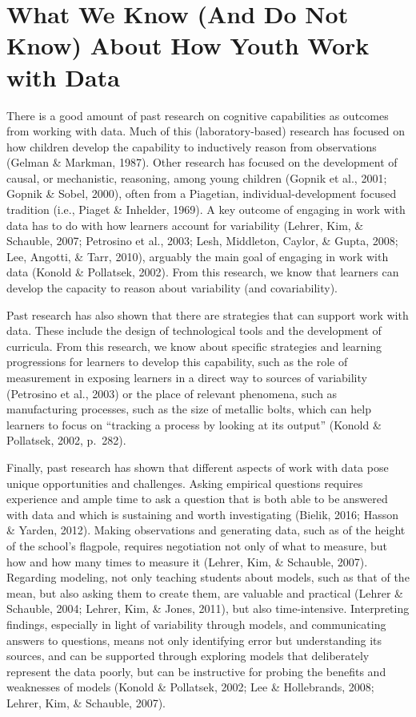 \documentclass[]{msu-thesis}
\theoremstyle{definition}
\theoremstyle{definition}
\theoremstyle{definition}
\theoremstyle{remark}
\begin{document}
\section{What We Know (And Do Not Know) About How Youth Work with
Data}\label{what-we-know-and-do-not-know-about-how-youth-work-with-data}

There is a good amount of past research on cognitive capabilities as
outcomes from working with data. Much of this (laboratory-based)
research has focused on how children develop the capability to
inductively reason from observations (Gelman \& Markman, 1987). Other
research has focused on the development of causal, or mechanistic,
reasoning, among young children (Gopnik et al., 2001; Gopnik \& Sobel,
2000), often from a Piagetian, individual-development focused tradition
(i.e., Piaget \& Inhelder, 1969). A key outcome of engaging in work with
data has to do with how learners account for variability (Lehrer, Kim,
\& Schauble, 2007; Petrosino et al., 2003; Lesh, Middleton, Caylor, \&
Gupta, 2008; Lee, Angotti, \& Tarr, 2010), arguably the main goal of
engaging in work with data (Konold \& Pollatsek, 2002). From this
research, we know that learners can develop the capacity to reason about
variability (and covariability).

Past research has also shown that there are strategies that can support
work with data. These include the design of technological tools and the
development of curricula. From this research, we know about specific
strategies and learning progressions for learners to develop this
capability, such as the role of measurement in exposing learners in a
direct way to sources of variability (Petrosino et al., 2003) or the
place of relevant phenomena, such as manufacturing processes, such as
the size of metallic bolts, which can help learners to focus on
``tracking a process by looking at its output'' (Konold \& Pollatsek,
2002, p.~282).

Finally, past research has shown that different aspects of work with
data pose unique opportunities and challenges. Asking empirical
questions requires experience and ample time to ask a question that is
both able to be answered with data and which is sustaining and worth
investigating (Bielik, 2016; Hasson \& Yarden, 2012). Making
observations and generating data, such as of the height of the school's
flagpole, requires negotiation not only of what to measure, but how and
how many times to measure it (Lehrer, Kim, \& Schauble, 2007). Regarding
modeling, not only teaching students about models, such as that of the
mean, but also asking them to create them, are valuable and practical
(Lehrer \& Schauble, 2004; Lehrer, Kim, \& Jones, 2011), but also
time-intensive. Interpreting findings, especially in light of
variability through models, and communicating answers to questions,
means not only identifying error but understanding its sources, and can
be supported through exploring models that deliberately represent the
data poorly, but can be instructive for probing the benefits and
weaknesses of models (Konold \& Pollatsek, 2002; Lee \& Hollebrands,
2008; Lehrer, Kim, \& Schauble, 2007).
\end{document}
